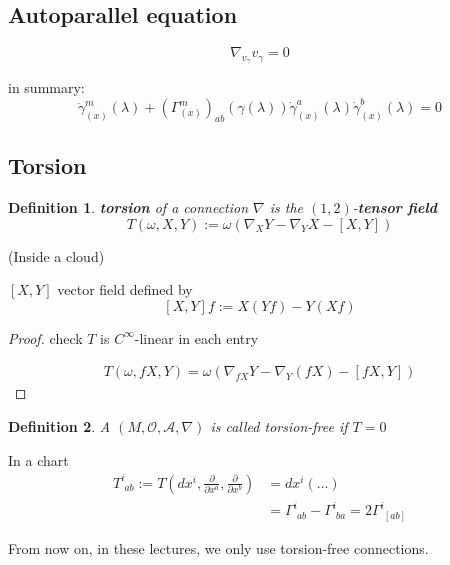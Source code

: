 \documentclass[10pt, twoside]{amsart}
\newtheorem{definition}{Definition}
\begin{document}
\begin{multicols*}{2}
\subsection{Autoparallel equation}

\[
\nabla_{v_{\gamma}} v_{\gamma} =0 
\]

in summary:
\begin{equation}
  \ddot{\gamma}^m_{(x)}(\lambda) + (\Gamma^m_{(x)})_{ab}(\gamma(\lambda)) \dot{\gamma}^a_{(x)}(\lambda) \dot{\gamma}^b_{(x)}(\lambda) = 0 
\end{equation}

\subsection{Torsion}

\begin{definition}
  \textbf{torsion} of a connection $\nabla$ is the $(1,2)$-\textbf{tensor field}
\begin{equation}
  T(\omega,X,Y) := \omega( \nabla_X Y - \nabla_Y X - [X,Y])
\end{equation}
\end{definition}

(Inside a cloud) 

$[X,Y]$ vector field defined by 
\[
[X,Y]f:= X(Yf) - Y(Xf)
\]

\begin{proof}
  check $T$ is $C^{\infty}$-linear in each entry

\[
\begin{gathered}
  T(\omega, fX,Y) = \omega ( \nabla_{fX} Y - \nabla_Y (fX) - [fX,Y] )
\end{gathered}
\]
\end{proof}

\begin{definition}
  A $(M, \mathcal{O}, \mathcal{A}, \nabla)$ is called torsion-free if $T=0$
\end{definition}

In a chart 
\[
\begin{aligned}
  T^i_{ \, \, ab } := T\left(dx^i , \frac{ \partial }{ \partial x^a} , \frac{ \partial }{ \partial x^b}  \right) & = dx^i ( \dots ) \\ 
  & = \Gamma^i_{ \, \, ab} - \Gamma^i_{ \, \, ba} = 2 \Gamma^i_{ \, \, [ab] }
\end{aligned}
\]

From now on, in these lectures, we only use torsion-free connections. 


\end{multicols*}
\end{document}
